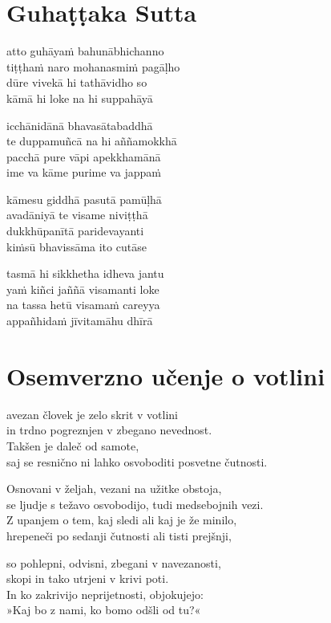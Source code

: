 

\cleartoverso
\chapter*{Guhaṭṭaka Sutta}

atto guhāyaṁ bahunābhichanno\\
tiṭṭhaṁ naro mohanasmiṁ pagāḷho\\
dūre vivekā hi tathāvidho so\\
kāmā hi loke na hi suppahāyā

icchānidānā bhavasātabaddhā\\
te duppamuñcā na hi aññamokkhā\\
pacchā pure vāpi apekkhamānā\\
ime va kāme purime va jappaṁ

kāmesu giddhā pasutā pamūḷhā\\
avadāniyā te visame niviṭṭhā\\
dukkhūpanītā paridevayanti\\
kiṁsū bhavissāma ito cutāse

tasmā hi sikkhetha idheva jantu\\
yaṁ kiñci jaññā visamanti loke\\
na tassa hetū visamaṁ careyya\\
appañhidaṁ jīvitamāhu dhīrā


\cleartorecto
\chapter{Osemverzno učenje o votlini}

avezan človek je zelo skrit v votlini\\
in trdno pogreznjen v zbegano nevednost.\\
Takšen je daleč od samote,\\
saj se resnično ni lahko osvoboditi posvetne čutnosti.

Osnovani v željah, vezani na užitke obstoja,\\
se ljudje s težavo osvobodijo, tudi medsebojnih vezi.\\
Z upanjem o tem, kaj sledi ali kaj je že minilo,\\
hrepeneči po sedanji čutnosti ali tisti prejšnji,

so pohlepni, odvisni, zbegani v navezanosti,\\
skopi in tako utrjeni v krivi poti.\\
In ko zakrivijo neprijetnosti, objokujejo:\\
»Kaj bo z nami, ko bomo odšli od tu?«

